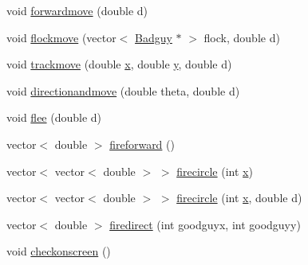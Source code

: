 \begin{DoxyCompactItemize}
\item 
void \hyperlink{classBadguy_ad974276dd33316dbe14d089f219222ac}{forwardmove} (double d)
\item 
void \hyperlink{classBadguy_af2cd3578e0c4a388fc9d08feec3a13f4}{flockmove} (vector$<$ \hyperlink{classBadguy}{Badguy} $\ast$ $>$ flock, double d)
\item 
void \hyperlink{classBadguy_a659925e76c4521b5238413647cf29d8b}{trackmove} (double \hyperlink{classBadguy_ab68f48d60da3630aeb3b0a8e6080acce}{x}, double \hyperlink{classBadguy_a59cb0a80da16789d9b89b1a94230c2a5}{y}, double d)
\item 
void \hyperlink{classBadguy_afc6cee672537ef4bfec947851c86b555}{directionandmove} (double theta, double d)
\item 
void \hyperlink{classBadguy_a38accc6d49c10915c9d3d33d9a1900e6}{flee} (double d)
\item 
vector$<$ double $>$ \hyperlink{classBadguy_aa0010353f16911f941736c94485c9ce3}{fireforward} ()
\item 
vector$<$ vector$<$ double $>$ $>$ \hyperlink{classBadguy_a8a62d81d53b6c2070dcf989a2c171e89}{firecircle} (int \hyperlink{classBadguy_ab68f48d60da3630aeb3b0a8e6080acce}{x})
\item 
vector$<$ vector$<$ double $>$ $>$ \hyperlink{classBadguy_a910bacea93b61c243bddd0312f19d5a1}{firecircle} (int \hyperlink{classBadguy_ab68f48d60da3630aeb3b0a8e6080acce}{x}, double d)
\item 
vector$<$ double $>$ \hyperlink{classBadguy_a037e7399898c5de7e991f8299181062e}{firedirect} (int goodguyx, int goodguyy)
\item 
void \hyperlink{classBadguy_a2d3f37d991cccc2870f93de58c57a265}{checkonscreen} ()
\end{DoxyCompactItemize}
